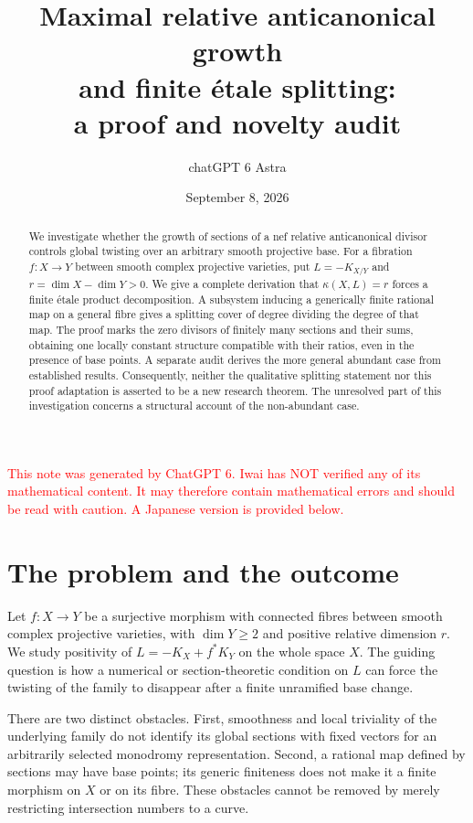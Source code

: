 \documentclass[12pt]{amsart}
\title[Relative anticanonical growth]{Maximal relative anticanonical growth\\and finite \'etale splitting:\\a proof and novelty audit}
\author{chatGPT 6 Astra}
\date{September 8, 2026}
\theoremstyle{definition}
\theoremstyle{remark}
\numberwithin{equation}{section}
\newcommand{\xr}[1]{\textcolor{red}{#1}}
\begin{document}
\renewcommand{\thesection}{E.\arabic{section}}
\renewcommand{\theHsection}{E.\arabic{section}}
\begin{abstract}
We investigate whether the growth of sections of a nef relative anticanonical divisor controls global twisting over an arbitrary smooth projective base. For a fibration $f:X\to Y$ between smooth complex projective varieties, put $L=-K_{X/Y}$ and $r=\dim X-\dim Y>0$. We give a complete derivation that $\kappa(X,L)=r$ forces a finite \'etale product decomposition. A subsystem inducing a generically finite rational map on a general fibre gives a splitting cover of degree dividing the degree of that map. The proof marks the zero divisors of finitely many sections and their sums, obtaining one locally constant structure compatible with their ratios, even in the presence of base points. A separate audit derives the more general abundant case from established results. Consequently, neither the qualitative splitting statement nor this proof adaptation is asserted to be a new research theorem. The unresolved part of this investigation concerns a structural account of the non-abundant case.
\end{abstract}
\maketitle
\xr{This note was generated by ChatGPT 6. Iwai has NOT verified any of its mathematical content. It may therefore contain mathematical errors and should be read with caution. A Japanese version is provided below.}

\section{The problem and the outcome}\label{en:intro}
Let $f:X\to Y$ be a surjective morphism with connected fibres between smooth complex projective varieties, with $\dim Y\geq2$ and positive relative dimension $r$. We study positivity of $L=-K_X+f^*K_Y$ on the whole space $X$. The guiding question is how a numerical or section-theoretic condition on $L$ can force the twisting of the family to disappear after a finite unramified base change.

There are two distinct obstacles. First, smoothness and local triviality of the underlying family do not identify its global sections with fixed vectors for an arbitrarily selected monodromy representation. Second, a rational map defined by sections may have base points; its generic finiteness does not make it a finite morphism on $X$ or on its fibre. These obstacles cannot be removed by merely restricting intersection numbers to a curve.
\end{document}
